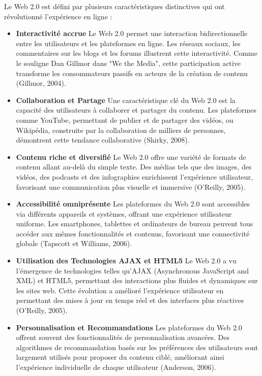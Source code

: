 \documentclass[12pt,a4paper]{article} %
\begin{document}
	Le Web 2.0 est défini par plusieurs caractéristiques distinctives qui ont révolutionné l'expérience en ligne :
	\begin{itemize}
		\item {\textbf{Interactivité accrue}}
		Le Web 2.0 permet une interaction bidirectionnelle entre les utilisateurs et les plateformes en ligne. Les réseaux sociaux, les commentaires sur les blogs et les forums illustrent cette interactivité. Comme le souligne Dan Gillmor dans "We the Media", cette participation active transforme les consommateurs passifs en acteurs de la création de contenu (Gillmor, 2004).
		\item {\textbf{Collaboration et Partage}}
		Une caractéristique clé du Web 2.0 est la capacité des utilisateurs à collaborer et partager du contenu. Les plateformes comme YouTube, permettant de publier et de partager des vidéos, ou Wikipédia, construite par la collaboration de milliers de personnes, démontrent cette tendance collaborative (Shirky, 2008).
		\item {\textbf{Contenu riche et diversifié}}
		Le Web 2.0 offre une variété de formats de contenu allant au-delà du simple texte. Des médias tels que des images, des vidéos, des podcasts et des infographies enrichissent l'expérience utilisateur, favorisant une communication plus visuelle et immersive (O'Reilly, 2005).
		\item {\textbf{Accessibilité omniprésente}}
		Les plateformes du Web 2.0 sont accessibles via différents appareils et systèmes, offrant une expérience utilisateur uniforme. Les smartphones, tablettes et ordinateurs de bureau peuvent tous accéder aux mêmes fonctionnalités et contenus, favorisant une connectivité globale (Tapscott et Williams, 2006).
		\item {\textbf{Utilisation des Technologies AJAX et HTML5}}
		Le Web 2.0 a vu l'émergence de technologies telles qu'AJAX (Asynchronous JavaScript and XML) et HTML5, permettant des interactions plus fluides et dynamiques sur les sites web. Cette évolution a amélioré l'expérience utilisateur en permettant des mises à jour en temps réel et des interfaces plus réactives (O'Reilly, 2005).
		\item {\textbf{Personnalisation et Recommandations}}
		Les plateformes du Web 2.0 offrent souvent des fonctionnalités de personnalisation avancées. Des algorithmes de recommandation basés sur les préférences des utilisateurs sont largement utilisés pour proposer du contenu ciblé, améliorant ainsi l'expérience individuelle de chaque utilisateur (Anderson, 2006).

\end{itemize}
\end{document}
